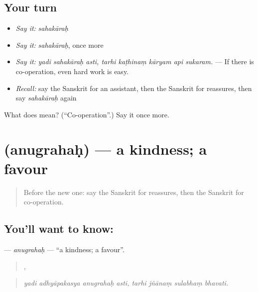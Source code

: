 \subsection*{Your turn}
\begin{itemize}
\raggedright
  \item \emph{Say it:} \emph{sahakāraḥ}
  \item \emph{Say it:} \emph{sahakāraḥ}, once more
  \item \emph{Say it:} \emph{yadi sahakāraḥ asti, tarhi kaṭhinaṃ kāryam api sukaram.} — If there is co-operation, even hard work is easy.
  \item \emph{Recall:} say the Sanskrit for an assistant, then the Sanskrit for reassures, then say \emph{sahakāraḥ} again
\end{itemize}

\begin{tcolorbox}[breakable,colback=teal!4,colframe=teal!35!black,title={Before you move on}]
What does  mean? (\textquotedblleft{}Co-operation\textquotedblright{}.) Say it once more.
\end{tcolorbox}
\section[\texorpdfstring{\sk{अनुग्रहः} (anugrahaḥ)}{अनुग्रहः (anugrahaḥ)}]{ (anugrahaḥ) — a kindness; a favour}

\label{lesson:SA-C392-anugrahah}



\begin{quote}
Before the new one: say the Sanskrit for reassures, then the Sanskrit for co-operation.
\end{quote}

\subsection*{You'll want to know: }
\textbf{} — \emph{anugrahaḥ} — \textquotedblleft{}a kindness; a favour\textquotedblright{}.

\begin{quote}
   ,    
\end{quote}

\begin{quote}
\emph{yadi adhyāpakasya anugrahaḥ asti, tarhi jñānaṃ sulabhaṃ bhavati.}
\end{quote}

